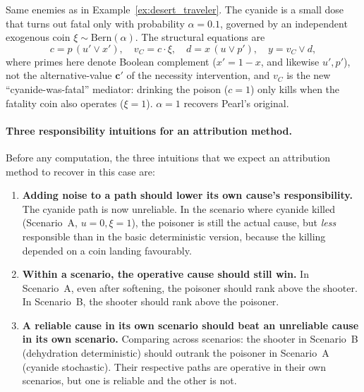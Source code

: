 \begin{example}\label{ex:desert_traveler_weak_poison}
Same enemies as in Example~\ref{ex:desert_traveler}. The cyanide is a small
dose that turns out fatal only with probability $\alpha = 0.1$, governed by
an independent exogenous coin $\xi \sim \mathrm{Bern}(\alpha)$. The structural
equations are
\[
c = p\,(u' \vee x'), \quad v_C = c\cdot \xi, \quad d = x\,(u \vee p'),
\quad y = v_C \vee d,
\]
where primes here denote Boolean complement ($x'=1-x$, and likewise $u',p'$), not
the alternative-value $\mathbf{c}'$ of the necessity intervention, and $v_C$ is the
new ``cyanide-was-fatal'' mediator: drinking the poison
($c=1$) only kills when the fatality coin also operates ($\xi=1$).
$\alpha = 1$ recovers Pearl's original.
\end{example}

\paragraph{Three responsibility intuitions for an attribution method.}

Before any computation, the three intuitions that we expect an attribution method to recover in this case are:


\begin{enumerate}\setlength\itemsep{0.2em}
    \item\textbf{Adding noise to a path should lower its own cause's
        responsibility.} The cyanide path is now unreliable. In the
        scenario where cyanide killed (Scenario~A, $u=0, \xi=1$), the
        poisoner is still the actual cause, but \emph{less} responsible
        than in the basic deterministic version, because the killing
        depended on a coin landing favourably.
    \item\textbf{Within a scenario, the operative cause should still win.}
        In Scenario~A, even after softening, the poisoner should rank above
        the shooter. In Scenario~B, the shooter should rank above the poisoner.
    \item\textbf{A reliable cause in its own scenario should beat an
        unreliable cause in its own scenario.} Comparing across scenarios:
        the shooter in Scenario~B (dehydration deterministic) should outrank
        the poisoner in Scenario~A (cyanide stochastic). Their respective
        paths are operative in their own scenarios, but one is reliable and
        the other is not.
\end{enumerate}

